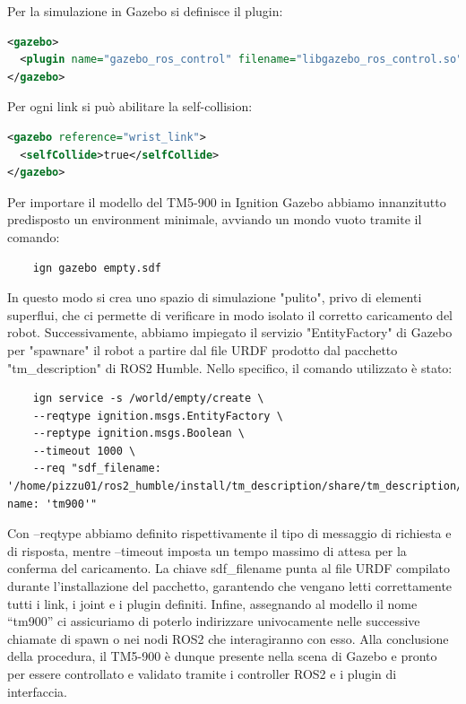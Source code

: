 \documentclass[11pt]{report}
\begin{document}
Per la simulazione in Gazebo si definisce il plugin:

\begin{lstlisting}[language=xml]
<gazebo>
  <plugin name="gazebo_ros_control" filename="libgazebo_ros_control.so"/>
</gazebo>
\end{lstlisting}
\vspace{1em}
Per ogni link si può abilitare la self-collision:

\begin{lstlisting}[language=xml]
<gazebo reference="wrist_link">
  <selfCollide>true</selfCollide>
</gazebo>
\end{lstlisting}
\vspace{1em}

Per importare il modello del TM5-900 in Ignition Gazebo abbiamo innanzitutto predisposto un environment minimale, avviando un mondo vuoto tramite il comando:  
\begin{verbatim}
    ign gazebo empty.sdf
\end{verbatim}
In questo modo si crea uno spazio di simulazione "pulito", privo di elementi superflui, che ci permette di verificare in modo isolato il corretto caricamento del robot. Successivamente, abbiamo impiegato il servizio "EntityFactory" di Gazebo per "spawnare" il robot a partire dal file URDF prodotto dal pacchetto "tm\_description" di ROS2 Humble. Nello specifico, il comando utilizzato è stato:  
\begin{verbatim}
    ign service -s /world/empty/create \
    --reqtype ignition.msgs.EntityFactory \
    --reptype ignition.msgs.Boolean \
    --timeout 1000 \
    --req "sdf_filename: '/home/pizzu01/ros2_humble/install/tm_description/share/tm_description/urdf/tm900_robot_prova2.urdf', name: 'tm900'"
\end{verbatim}

Con --reqtype abbiamo definito rispettivamente il tipo di messaggio di richiesta e di risposta, mentre --timeout imposta un tempo massimo di attesa per la conferma del caricamento. La chiave sdf\_filename punta al file URDF compilato durante l’installazione del pacchetto, garantendo che vengano letti correttamente tutti i link, i joint e i plugin definiti. Infine, assegnando al modello il nome “tm900” ci assicuriamo di poterlo indirizzare univocamente nelle successive chiamate di spawn o nei nodi ROS2 che interagiranno con esso. Alla conclusione della procedura, il TM5-900 è dunque presente nella scena di Gazebo e pronto per essere controllato e validato tramite i controller ROS2 e i plugin di interfaccia.
\end{document}

